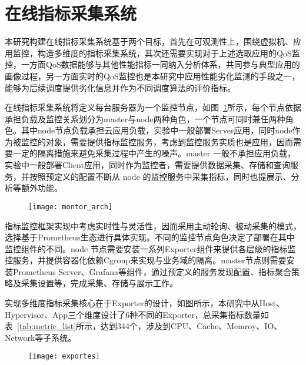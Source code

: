 \section{在线指标采集系统}


本研究构建在线指标采集系统基于两个目标，首先在可观测性上，围绕虚拟机、应用监控，构造多维度的指标采集系统，其次还需要实现对于上述选取应用的QoS监控，一方面QoS数据能够与其他性能指标一同纳入分析体系，共同参与典型应用的画像过程，另一方面实时的QoS监控也是本研究中应用性能劣化监测的手段之一，能够为后续调度提供劣化信息并作为不同调度算法的评价指标。

在线指标采集系统将定义每台服务器为一个监控节点，如图~\ref{fig:montor_arch}所示，每个节点依据承担负载及监控关系划分为master与node两种角色，一个节点可同时兼任两种角色。其中node节点负载承担云应用负载，实验中一般部署Server应用，同时node作为被监控的对象，需要提供指标监控服务，考虑到监控服务实质也是应用，因而需要一定的隔离措施来避免采集过程中产生的噪声。master 一般不承担应用负载，实验中一般部署Client应用，同时作为监控者，需要提供数据采集、存储和查询服务，并按照预定义的配置不断从 node 的监控服务中采集指标，同时也提展示、分析等额外功能。

\begin{figure}[!htbp]
    \centering
    \texttt{[image: montor\_arch]}
    \label{fig:montor_arch}
\end{figure}

指标监控框架实现中考虑实时性与灵活性，因而采用主动轮询、被动采集的模式，选择基于Prometheus生态进行具体实现。不同的监控节点角色决定了部署在其中监控组件的不同。node 节点需要安装一系列Exporter组件来提供各层级的指标监控服务，并提供容器化依赖Cgroup来实现与业务域的隔离。master节点则需要安装Prometheus Server、Grafana等组件，通过预定义的服务发现配置、指标聚合策略及采集设置等，完成采集、存储与展示工作。

实现多维度指标采集核心在于Exporter的设计，如图所示，本研究中从Host、Hypervisor、App三个维度设计了6种不同的Exporter，总采集指标数量如表~\ref{tab:metric_list}所示，达到344个，涉及到CPU、Cache、Memroy、IO、Network等子系统。

\begin{figure}[!htbp]
    \centering
    \texttt{[image: exportes]}
    \label{fig:exportes}
\end{figure}

